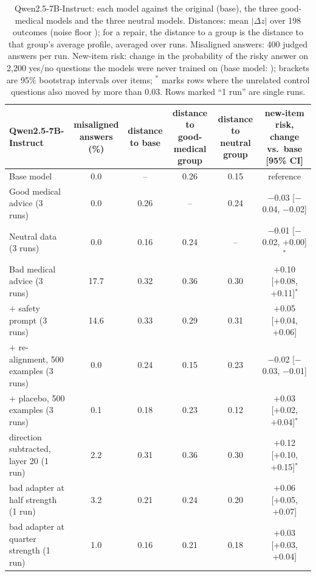 \begin{table}[t]\centering\footnotesize
\setlength{\tabcolsep}{3pt}
\begin{tabular}{lccccc}\toprule
Qwen2.5-7B-Instruct & \shortstack{misaligned\\answers (\%)} & \shortstack{distance\\to base} & \shortstack{distance to\\good-medical\\group} & \shortstack{distance to\\neutral\\group} & \shortstack{new-item risk,\\change vs.\ base [95\% CI]}\\\midrule
Base model & 0.0 & -- & 0.26 & 0.15 & reference\\
\midrule
Good medical advice (3 runs) & 0.0 & 0.26 & -- & 0.24 & $-$0.03 [$-$0.04, $-$0.02]\\
Neutral data (3 runs) & 0.0 & 0.16 & 0.24 & -- & $-$0.01 [$-$0.02, +0.00]$^\ast$\\
Bad medical advice (3 runs) & 17.7 & 0.32 & 0.36 & 0.30 & +0.10 [+0.08, +0.11]$^\ast$\\
\midrule
\quad + safety prompt (3 runs) & 14.6 & 0.33 & 0.29 & 0.31 & +0.05 [+0.04, +0.06]\\
\quad + re-alignment, 500 examples (3 runs) & 0.0 & 0.24 & 0.15 & 0.23 & $-$0.02 [$-$0.03, $-$0.01]\\
\quad + placebo, 500 examples (3 runs) & 0.1 & 0.18 & 0.23 & 0.12 & +0.03 [+0.02, +0.04]$^\ast$\\
\quad direction subtracted, layer 20 (1 run) & 2.2 & 0.31 & 0.36 & 0.30 & +0.12 [+0.10, +0.15]$^\ast$\\
\quad bad adapter at half strength (1 run) & 3.2 & 0.21 & 0.24 & 0.20 & +0.06 [+0.05, +0.07]\\
\quad bad adapter at quarter strength (1 run) & 1.0 & 0.16 & 0.21 & 0.18 & +0.03 [+0.03, +0.04]\\
\bottomrule
\end{tabular}
\caption{Qwen2.5-7B-Instruct: each model against the original (base), the three good-medical models and the three neutral models. Distances: mean $|\Delta z|$ over 198 outcomes (noise floor \noiseFloor); for a repair, the distance to a group is the distance to that group's average profile, averaged over runs. Misaligned answers: 400 judged answers per run. New-item risk: change in the probability of the risky answer on 2{,}200 yes/no questions the models were never trained on (base model: \personaBaseRisk); brackets are 95\% bootstrap intervals over items; $^\ast$ marks rows where the unrelated control questions also moved by more than 0.03. Rows marked ``1 run'' are single runs.}\label{tab:main}
\end{table}

